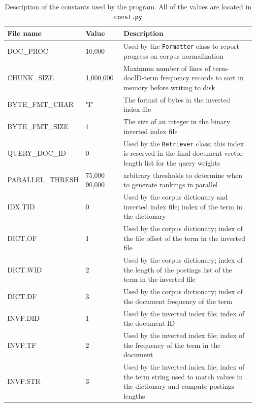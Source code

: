 \documentclass[11pt]{article}
\begin{document}
\begin{table}[!ht]
    \caption{Description of the constants used by the program. All of the values are located in \texttt{const.py}}
    \begin{center} \label{const}

        \begin{tabular}{| L{4cm} | L{1.5cm} | L{9cm} |}
        \hline
        \textbf{File name} & \textbf{Value} & \textbf{Description}
        \\ \hline
        DOC\_PROC & 10,000 & Used by the \texttt{Formatter} class to report progress on corpus normalization
        \\ \hline
        CHUNK\_SIZE & 1,000,000 & Maximum number of lines of term-docID-term frequency records to sort in memory before writing to disk
        \\ \hline
        BYTE\_FMT\_CHAR & "I" & The format of bytes in the inverted index file
        \\ \hline
        BYTE\_FMT\_SIZE & 4 & The size of an integer in the binary inverted index file
        \\ \hline
        QUERY\_DOC\_ID & 0 & Used by the \texttt{Retriever} class; this index is reserved in the final document vector length list for the query weights
        \\ \hline
        PARALLEL\_THRESH & 75,000  90,000 & arbitrary thresholds to determine when to generate rankings in parallel
        \\ \hline
        IDX.TID & 0 & Used by the corpus dictionary and inverted index file; index of the term in the dictionary
        \\ \hline
        DICT.OF & 1 & Used by the corpus dictionary; index of the file offset of the term in the inverted file
        \\ \hline
        DICT.WID & 2 & Used by the corpus dictionary; index of the length of the postings list of the term in the inverted file
        \\ \hline
        DICT.DF & 3 & Used by the corpus dictionary; index of the document frequency of the term
        \\ \hline
        INVF.DID & 1 & Used by the inverted index file; index of the document ID
        \\ \hline
        INVF.TF & 2 & Used by the inverted index file; index of the frequency of the term in the document
        \\ \hline
        INVF.STR & 3 & Used by the inverted index file; index of the term string used to match values in the dictionary and compute postings lengths
        \\ \hline
        \end{tabular}

    \end{center}

\end{table}
\newpage
\end{document}
